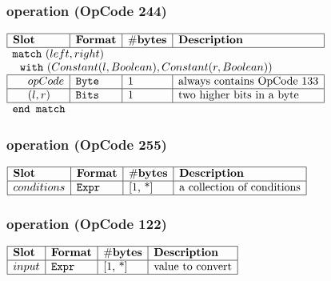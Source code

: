 \subsubsection{ operation (OpCode 244)}

\noindent
\(\begin{array}{| l | l | l | l |}
    \hline
    \bf{Slot} & \bf{Format} & \bf{\#bytes} & \bf{Description} \\
    \hline
        \multicolumn{4}{l}{\lst{match}~(left, right)} \\
         
    \multicolumn{4}{l}{~~\lst{with}~(Constant(l, Boolean), Constant(r, Boolean)) } \\
    \hline
            ~~~~ opCode & \lst{Byte} & \text{1} & \text{always contains OpCode 133} \\
    \hline
          ~~~~ (l,r) & \lst{Bits} & \text{1} & \text{two higher bits in a byte} \\
    \hline
          \multicolumn{4}{l}{\lst{end match}} \\
\end{array}\)
       

\subsubsection{ operation (OpCode 255)}

\noindent
\(\begin{array}{| l | l | l | l |}
    \hline
    \bf{Slot} & \bf{Format} & \bf{\#bytes} & \bf{Description} \\
    \hline
         conditions & \lst{Expr} & \text{[1, *]} & \text{a collection of conditions} \\
    \hline
      
\end{array}\)
       

\subsubsection{ operation (OpCode 122)}

\noindent
\(\begin{array}{| l | l | l | l |}
    \hline
    \bf{Slot} & \bf{Format} & \bf{\#bytes} & \bf{Description} \\
    \hline
         input & \lst{Expr} & \text{[1, *]} & \text{value to convert} \\
    \hline
      
\end{array}\)
       


